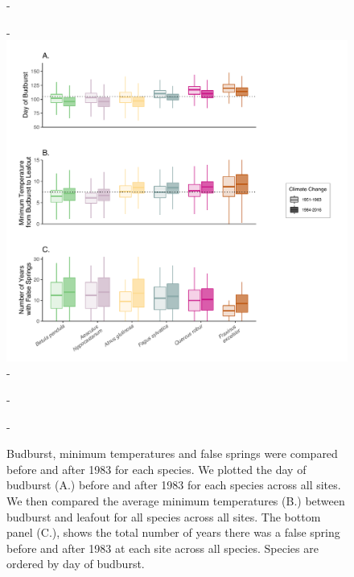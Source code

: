 \documentclass{article}\usepackage[]{graphicx}\usepackage[]{color}
\begin{document}
{\begin{figure} [H]
  -\begin{center}
  -\includegraphics[width=14cm]{..//figures/Boxplot_BBTminFS_noDots.pdf}
  -\caption{Budburst, minimum temperatures and false springs were compared before and after 1983 for each species. We plotted the day of budburst (A.) before and after 1983 for each species across all sites. We then compared the average minimum temperatures (B.) between budburst and leafout for all species across all sites. The bottom panel (C.), shows the total number of years there was a false spring before and after 1983 at each site across all species. Species are ordered by day of budburst.  }\label{fig:boxfs}
  -\end{center}
  -\end{figure}}
  
\end{document}
